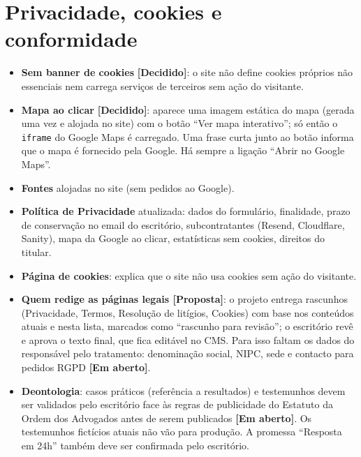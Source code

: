 \documentclass[11pt,a4paper]{article}
\newcommand{\decidido}{\textcolor{verde700}{\textbf{[Decidido]}}}
\newcommand{\proposta}{\textcolor{bronze}{\textbf{[Proposta]}}}
\newcommand{\aberto}{\textcolor{red!60!black}{\textbf{[Em aberto]}}}
\begin{document}
\section{Privacidade, cookies e conformidade}\label{sec:conformidade}
\begin{itemize}
  \item \textbf{Sem banner de cookies} \decidido: o site não define cookies próprios não essenciais nem carrega serviços de terceiros sem ação do visitante.
  \item \textbf{Mapa ao clicar} \decidido: aparece uma imagem estática do mapa (gerada uma vez e alojada no site) com o botão ``Ver mapa interativo''; só então o \texttt{iframe} do Google Maps é carregado. Uma frase curta junto ao botão informa que o mapa é fornecido pela Google. Há sempre a ligação ``Abrir no Google Maps''.
  \item \textbf{Fontes} alojadas no site (sem pedidos ao Google).
  \item \textbf{Política de Privacidade} atualizada: dados do formulário, finalidade, prazo de conservação no email do escritório, subcontratantes (Resend, Cloudflare, Sanity), mapa da Google ao clicar, estatísticas sem cookies, direitos do titular.
  \item \textbf{Página de cookies}: explica que o site não usa cookies sem ação do visitante.
  \item \textbf{Quem redige as páginas legais \proposta}: o projeto entrega rascunhos (Privacidade, Termos, Resolução de litígios, Cookies) com base nos conteúdos atuais e nesta lista, marcados como ``rascunho para revisão''; o escritório revê e aprova o texto final, que fica editável no CMS. Para isso faltam os dados do responsável pelo tratamento: denominação social, NIPC, sede e contacto para pedidos RGPD \aberto.
  \item \textbf{Deontologia}: casos práticos (referência a resultados) e testemunhos devem ser validados pelo escritório face às regras de publicidade do Estatuto da Ordem dos Advogados antes de serem publicados \aberto. Os testemunhos fictícios atuais não vão para produção. A promessa ``Resposta em 24h'' também deve ser confirmada pelo escritório.
\end{itemize}

\end{document}
